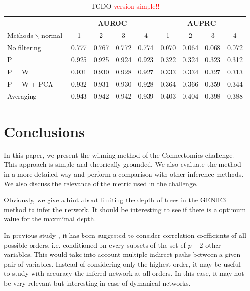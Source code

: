 \documentclass[wcp]{jmlr}
\begin{document}
\begin{table}[tbh]
\centering
\begin{tabular}{@{}l *{8}{c}@{}}
\hline
  & \multicolumn{4}{c}{AUROC} & \multicolumn{4}{c}{AUPRC} \\
\hline
Methods $\backslash$ normal- & 1 & 2 & 3 & 4 & 1 & 2 & 3 & 4 \\
No  filtering       & 0.777 & 0.767 & 0.772 & 0.774 & 0.070 & 0.064 & 0.068 & 0.072\\
P                   & 0.925 & 0.925 & 0.924 & 0.923 & 0.322 & 0.324 & 0.323 & 0.312\\
P + W               & 0.931 & 0.930 & 0.928 & 0.927 & 0.333 & 0.334 & 0.327 & 0.313\\
P + W + PCA         & 0.932 & 0.931 & 0.930 & 0.928 & 0.364 & 0.366 & 0.359 & 0.344\\
Averaging           & 0.943 & 0.942 & 0.942 & 0.939 & 0.403 & 0.404 & 0.398 & 0.388\\
\end{tabular}
\caption{TODO \textcolor{red}{version simple!!}}
\label{tab:tab3}
\end{table}



\section{Conclusions} \label{sec:conclusion}






In this paper, we present the winning method of the Connectomics challenge.
This approach is simple and theorically grounded. We also evaluate the method
in a more detailed way and perform a comparison with other inference methods.
We also discuss the relevance of the metric used in the challenge.

Obviously, we give a hint about limiting the depth of trees in the GENIE3
method to infer the network. It should be interesting to see if there is a
optimum value for the maxmimal depth.

In previous study \citep{shipley2002cause}, it has been suggested to
consider correlation coefficients of all possible orders,
i.e. conditioned on every subsets of the set of $p-2$ other variables. This
would take into account multiple indirect paths between a given pair of
variables. Instead of considering only the highest order, it may be useful to
study with accuracy the infered network at all orders. In this case, it may not
be very relevant but interesting in case of dymanical networks.
\end{document}

